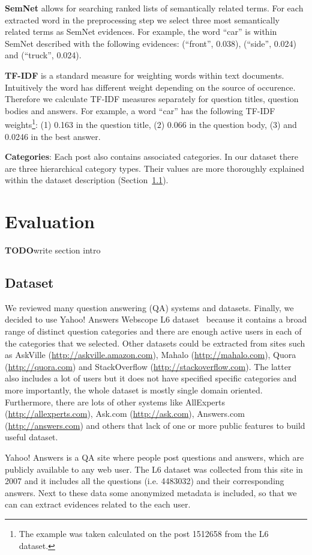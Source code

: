 \documentclass[conference]{IEEEtran}
\newcommand{\secref}[1]{Section~\ref{#1}}
\newcommand{\TODO}[0]{{\color{BrickRed}\textbf{TODO}}}
\begin{document}
{\bf SemNet} allows for searching ranked lists of semantically related terms. For each extracted word in the preprocessing step we select three most semantically related terms as SemNet evidences. For example, the word ``car'' is within SemNet described with the following evidences: (``front'', 0.038), (``side'', 0.024) and (``truck'', 0.024).

{\bf TF-IDF} is a standard measure for weighting words within text documents. Intuitively the word has different weight depending on the source of occurence. Therefore we calculate TF-IDF measures separately for question titles, question bodies and answers. For example, a word ``car'' has the following TF-IDF weights\footnote{The example was taken calculated on the post 1512658 from the L6 dataset.}: (1) 0.163 in the question title, (2) 0.066 in the question body, (3) and 0.0246 in the best answer. 

{\bf Categories}:
Each post also contains associated categories. In our dataset there are three hierarchical category types. Their values are more thoroughly explained within the dataset description (\secref{sec:dataset}).


\section{Evaluation}
\TODO write section intro


\subsection{Dataset}
\label{sec:dataset}
We reviewed many question answering (QA) systems and datasets. Finally, we decided to use Yahoo! Answers Webscope L6 dataset~\cite{bib:yahool6} because it contains a broad range of distinct question categories and there are enough active users in each of the categories that we selected. Other datasets could be extracted from sites such as AskVille (\url{http://askville.amazon.com}), Mahalo (\url{http://mahalo.com}), Quora (\url{http://quora.com}) and StackOverflow (\url{http://stackoverflow.com}). The latter also includes a lot of users but it does not have specified specific categories and more importantly, the whole dataset is mostly single domain oriented. Furthermore, there are lots of other systems like AllExperts (\url{http://allexperts.com}), Ask.com (\url{http://ask.com}), Answers.com (\url{http://answers.com}) and others that lack of one or more public features to build useful dataset.

Yahoo! Answers is a QA site where people post questions and answers, which are publicly available to any web user. The L6 dataset was collected from this site in 2007 and it includes all the questions (i.e. 4483032) and their corresponding answers. Next to these data some anonymized metadata is included, so that we can can extract evidences related to the each user.
\end{document}

